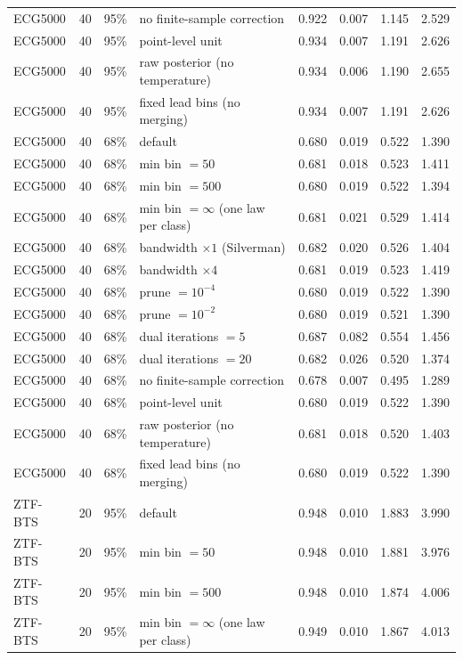 \begin{longtable}{lllp{4.2cm}cccc}
ECG5000 & 40 & 95\% & no finite-sample correction & 0.922 & 0.007 & 1.145 & 2.529 \\
ECG5000 & 40 & 95\% & point-level unit & 0.934 & 0.007 & 1.191 & 2.626 \\
ECG5000 & 40 & 95\% & raw posterior (no temperature) & 0.934 & 0.006 & 1.190 & 2.655 \\
ECG5000 & 40 & 95\% & fixed lead bins (no merging) & 0.934 & 0.007 & 1.191 & 2.626 \\
ECG5000 & 40 & 68\% & default & 0.680 & 0.019 & 0.522 & 1.390 \\
ECG5000 & 40 & 68\% & min bin $= 50$ & 0.681 & 0.018 & 0.523 & 1.411 \\
ECG5000 & 40 & 68\% & min bin $= 500$ & 0.680 & 0.019 & 0.522 & 1.394 \\
ECG5000 & 40 & 68\% & min bin $= \infty$ (one law per class) & 0.681 & 0.021 & 0.529 & 1.414 \\
ECG5000 & 40 & 68\% & bandwidth $\times 1$ (Silverman) & 0.682 & 0.020 & 0.526 & 1.404 \\
ECG5000 & 40 & 68\% & bandwidth $\times 4$ & 0.681 & 0.019 & 0.523 & 1.419 \\
ECG5000 & 40 & 68\% & prune $= 10^{-4}$ & 0.680 & 0.019 & 0.522 & 1.390 \\
ECG5000 & 40 & 68\% & prune $= 10^{-2}$ & 0.680 & 0.019 & 0.521 & 1.390 \\
ECG5000 & 40 & 68\% & dual iterations $= 5$ & 0.687 & 0.082 & 0.554 & 1.456 \\
ECG5000 & 40 & 68\% & dual iterations $= 20$ & 0.682 & 0.026 & 0.520 & 1.374 \\
ECG5000 & 40 & 68\% & no finite-sample correction & 0.678 & 0.007 & 0.495 & 1.289 \\
ECG5000 & 40 & 68\% & point-level unit & 0.680 & 0.019 & 0.522 & 1.390 \\
ECG5000 & 40 & 68\% & raw posterior (no temperature) & 0.681 & 0.018 & 0.520 & 1.403 \\
ECG5000 & 40 & 68\% & fixed lead bins (no merging) & 0.680 & 0.019 & 0.522 & 1.390 \\
ZTF-BTS & 20 & 95\% & default & 0.948 & 0.010 & 1.883 & 3.990 \\
ZTF-BTS & 20 & 95\% & min bin $= 50$ & 0.948 & 0.010 & 1.881 & 3.976 \\
ZTF-BTS & 20 & 95\% & min bin $= 500$ & 0.948 & 0.010 & 1.874 & 4.006 \\
ZTF-BTS & 20 & 95\% & min bin $= \infty$ (one law per class) & 0.949 & 0.010 & 1.867 & 4.013 \\

\end{longtable}
